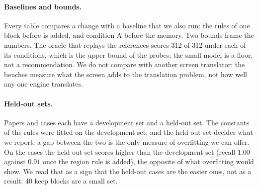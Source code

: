 \paragraph{Baselines and bounds.} Every table compares a change with a baseline that we also run: the rules of one block before  is
added, and condition A before the memory. Two bounds frame the numbers. The oracle that replays the references scores 312 of 312 under each of its
conditions, which is the upper bound of the probes; the small model is a floor, not a recommendation. We do not compare with another screen
translator: the benches measure what the screen adds to the translation problem, not how well any one engine translates.

\paragraph{Held-out sets.} Papers and cases each have a development set and a held-out set. The constants of the rules were fitted on the development
set, and the held-out set decides what we report; a gap between the two is the only measure of overfitting we can offer. On the cases the held-out set
scores higher than the development set (recall $1.00$ against $0.91$ once the region rule is added), the opposite of what overfitting would show. We read
that as a sign that the held-out cases are the easier ones, not as a result: 40 keep blocks are a small set.
